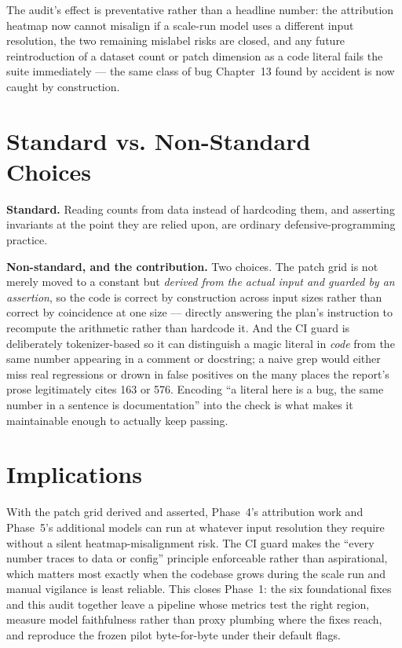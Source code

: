 The audit's effect is preventative rather than a headline number: the attribution heatmap now cannot
misalign if a scale-run model uses a different input resolution, the two remaining mislabel risks are
closed, and any future reintroduction of a dataset count or patch dimension as a code literal fails the
suite immediately --- the same class of bug Chapter~13 found by accident is now caught by construction.

\section{Standard vs. Non-Standard Choices}

\textbf{Standard.} Reading counts from data instead of hardcoding them, and asserting invariants at the
point they are relied upon, are ordinary defensive-programming practice.

\textbf{Non-standard, and the contribution.} Two choices. The patch grid is not merely moved to a
constant but \emph{derived from the actual input and guarded by an assertion}, so the code is correct by
construction across input sizes rather than correct by coincidence at one size --- directly answering
the plan's instruction to recompute the arithmetic rather than hardcode it. And the CI guard is
deliberately tokenizer-based so it can distinguish a magic literal in \emph{code} from the same number
appearing in a comment or docstring; a naive grep would either miss real regressions or drown in false
positives on the many places the report's prose legitimately cites 163 or 576. Encoding ``a literal
here is a bug, the same number in a sentence is documentation'' into the check is what makes it
maintainable enough to actually keep passing.

\section{Implications}

With the patch grid derived and asserted, Phase~4's attribution work and Phase~5's additional models can
run at whatever input resolution they require without a silent heatmap-misalignment risk. The CI guard
makes the ``every number traces to data or config'' principle enforceable rather than aspirational,
which matters most exactly when the codebase grows during the scale run and manual vigilance is least
reliable. This closes Phase~1: the six foundational fixes and this audit together leave a pipeline whose
metrics test the right region, measure model faithfulness rather than proxy plumbing where the fixes
reach, and reproduce the frozen pilot byte-for-byte under their default flags.
